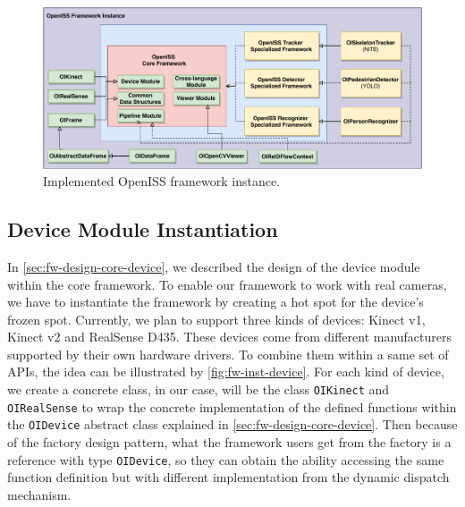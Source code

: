 \begin{figure}
    \includegraphics[width=\linewidth]{figures/framework_inst.pdf}
    \caption{Implemented OpenISS framework instance.}
    \label{fig:fw-inst}
\end{figure}

\subsection{Device Module Instantiation}
\label{sec:fw-inst-device}

In \autoref{sec:fw-design-core-device}, we described the design of the device
module within the core framework. To enable our framework to work with
real cameras, we have to instantiate the framework by creating a hot spot for 
the device's frozen spot.
Currently, we plan to support three kinds of devices: Kinect v1, Kinect v2 and
RealSense D435. These devices come from different manufacturers
supported by their own hardware drivers. To combine them within a same set of
APIs, the idea can be illustrated by \autoref{fig:fw-inst-device}. For each
kind of device, we create a concrete class, in our case, will be the class
\texttt{OIKinect} and \texttt{OIRealSense} to wrap the concrete implementation
of the defined functions within the \texttt{OIDevice} abstract class explained
in \autoref{sec:fw-design-core-device}.
Then because of the factory design pattern, what the framework users get from
the factory is a reference with type \texttt{OIDevice}, so they can obtain the
ability accessing the same function definition but with different implementation
from the dynamic dispatch mechanism.

